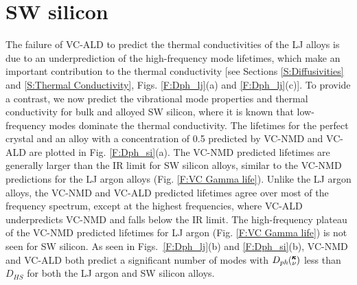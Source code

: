 
\clearpage

\section{\label{S:SW}SW silicon}

The failure of VC-ALD to predict the thermal conductivities of the LJ 
alloys is due to an underprediction of the high-frequency mode lifetimes, 
which make an important contribution to the thermal conductivity 
[see Sections \ref{S:Diffusivities} and \ref{S:Thermal Conductivity}, 
Figs. \ref{F:Dph_lj}(a) and \ref{F:Dph_lj}(c)]. To provide a contrast, 
we now predict the vibrational mode properties and thermal conductivity for bulk 
and alloyed SW silicon, where it is known that low-frequency modes 
dominate the thermal conductivity.
\cite{sellan_size_2010,sellan_cross-plane_2010} 
The lifetimes for the perfect crystal and an alloy with a concentration of 
0.5 predicted by VC-NMD and VC-ALD are plotted in Fig. \ref{F:Dph_si}(a). 
The VC-NMD predicted lifetimes are generally larger than 
the IR limit for SW silicon alloys, similar 
to the VC-NMD predictions for the LJ argon alloys 
(Fig. \ref{F:VC Gamma life}). Unlike the 
LJ argon alloys, the  
VC-NMD and VC-ALD predicted lifetimes agree over most 
of the frequency spectrum, except at the highest frequencies, where 
VC-ALD underpredicts VC-NMD and falls below the IR limit. 
The high-frequency plateau of the VC-NMD predicted lifetimes 
for LJ argon (Fig. \ref{F:VC Gamma life}) is not seen for SW silicon. 
As seen in Figs.~\ref{F:Dph_lj}(b) 
and \ref{F:Dph_si}(b), VC-NMD and VC-ALD both predict a significant 
number of modes with  
$D_{ph}\mspace{-4.0mu}\left(\mspace{-8.0mu} \begin{smallmatrix}&\pmb{\kappa} \\&\nu \end{smallmatrix}\mspace{-3.0mu}\right)$ less than $D_{HS}$ for both the LJ argon and 
SW silicon alloys. 

